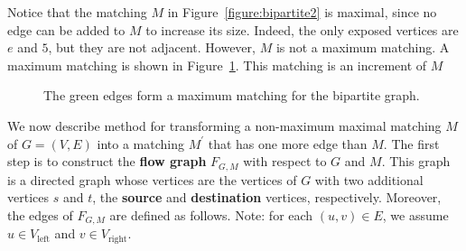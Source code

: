 \documentclass [12pt]{article}
\theoremstyle{definition}
\begin{document}
Notice that the matching $M$ in Figure~\ref{figure:bipartite2} is maximal, since no edge can be added to $M$ to increase its size. Indeed, the only exposed vertices are $e$ and $5$, but they are not adjacent.
However, $M$ is not a maximum matching. A maximum matching is shown in Figure~\ref{figure:bipartite3}. This matching is an increment of $M$

\begin{figure}
\centering
{}
\caption{The green edges form a maximum matching for the bipartite graph.}
\label{figure:bipartite3}
\end{figure}

We now describe method for transforming a non-maximum maximal matching $M$ of $G=(V,E)$ into a matching $M^{\prime}$ that has one more edge than $M$. 
The first step is to construct the \textbf{flow graph} $F_{G,M}$ with respect to $G$ and $M$. This graph is a directed graph whose vertices are the vertices of $G$ with two 
additional vertices $s$ and $t$, the \textbf{source} and \textbf{destination} vertices, respectively. Moreover, the edges of $F_{G,M}$ are defined as follows. Note: for each 
$(u,v)\in E$, we assume $u\in V_{\mbox{left}}$ and  $v\in V_{\mbox{right}}$.
\end{document}

